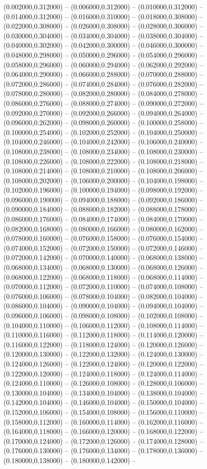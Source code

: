    (0.002000,0.312000) -- (0.006000,0.312000) -- (0.010000,0.312000) -- (0.014000,0.312000) -- (0.016000,0.310000) -- (0.018000,0.308000) -- (0.022000,0.308000) -- (0.026000,0.308000) -- (0.028000,0.306000) -- (0.030000,0.304000) -- (0.034000,0.304000) -- (0.038000,0.304000) -- (0.040000,0.302000) -- (0.042000,0.300000) -- (0.046000,0.300000) -- (0.048000,0.298000) -- (0.050000,0.296000) -- (0.054000,0.296000) -- (0.058000,0.296000) -- (0.060000,0.294000) -- (0.062000,0.292000) -- (0.064000,0.290000) -- (0.066000,0.288000) -- (0.070000,0.288000) -- (0.072000,0.286000) -- (0.074000,0.284000) -- (0.076000,0.282000) -- (0.078000,0.280000) -- (0.082000,0.280000) -- (0.084000,0.278000) -- (0.086000,0.276000) -- (0.088000,0.274000) -- (0.090000,0.272000) -- (0.092000,0.270000) -- (0.092000,0.266000) -- (0.094000,0.264000) -- (0.096000,0.262000) -- (0.098000,0.260000) -- (0.100000,0.258000) -- (0.100000,0.254000) -- (0.102000,0.252000) -- (0.104000,0.250000) -- (0.104000,0.246000) -- (0.104000,0.242000) -- (0.106000,0.240000) -- (0.108000,0.238000) -- (0.108000,0.234000) -- (0.108000,0.230000) -- (0.108000,0.226000) -- (0.108000,0.222000) -- (0.108000,0.218000) -- (0.108000,0.214000) -- (0.108000,0.210000) -- (0.108000,0.206000) -- (0.108000,0.202000) -- (0.106000,0.200000) -- (0.104000,0.198000) -- (0.102000,0.196000) -- (0.100000,0.194000) -- (0.098000,0.192000) -- (0.096000,0.190000) -- (0.094000,0.188000) -- (0.092000,0.186000) -- (0.090000,0.184000) -- (0.088000,0.182000) -- (0.088000,0.178000) -- (0.086000,0.176000) -- (0.084000,0.174000) -- (0.084000,0.170000) -- (0.082000,0.168000) -- (0.080000,0.166000) -- (0.080000,0.162000) -- (0.078000,0.160000) -- (0.076000,0.158000) -- (0.076000,0.154000) -- (0.074000,0.152000) -- (0.072000,0.150000) -- (0.072000,0.146000) -- (0.072000,0.142000) -- (0.070000,0.140000) -- (0.068000,0.138000) -- (0.068000,0.134000) -- (0.068000,0.130000) -- (0.068000,0.126000) -- (0.068000,0.122000) -- (0.068000,0.118000) -- (0.068000,0.114000) -- (0.070000,0.112000) -- (0.072000,0.110000) -- (0.074000,0.108000) -- (0.076000,0.106000) -- (0.078000,0.104000) -- (0.082000,0.104000) -- (0.086000,0.104000) -- (0.090000,0.104000) -- (0.094000,0.104000) -- (0.096000,0.106000) -- (0.098000,0.108000) -- (0.102000,0.108000) -- (0.104000,0.110000) -- (0.106000,0.112000) -- (0.108000,0.114000) -- (0.110000,0.116000) -- (0.112000,0.118000) -- (0.114000,0.120000) -- (0.116000,0.122000) -- (0.118000,0.124000) -- (0.120000,0.126000) -- (0.120000,0.130000) -- (0.122000,0.132000) -- (0.124000,0.130000) -- (0.124000,0.126000) -- (0.122000,0.124000) -- (0.120000,0.122000) -- (0.122000,0.120000) -- (0.124000,0.118000) -- (0.124000,0.114000) -- (0.124000,0.110000) -- (0.126000,0.108000) -- (0.128000,0.106000) -- (0.130000,0.104000) -- (0.134000,0.104000) -- (0.138000,0.104000) -- (0.142000,0.104000) -- (0.146000,0.104000) -- (0.150000,0.104000) -- (0.152000,0.106000) -- (0.154000,0.108000) -- (0.156000,0.110000) -- (0.158000,0.112000) -- (0.160000,0.114000) -- (0.162000,0.116000) -- (0.164000,0.118000) -- (0.166000,0.120000) -- (0.168000,0.122000) -- (0.170000,0.124000) -- (0.172000,0.126000) -- (0.174000,0.128000) -- (0.176000,0.130000) -- (0.176000,0.134000) -- (0.178000,0.136000) -- (0.180000,0.138000) -- (0.180000,0.142000) -- 